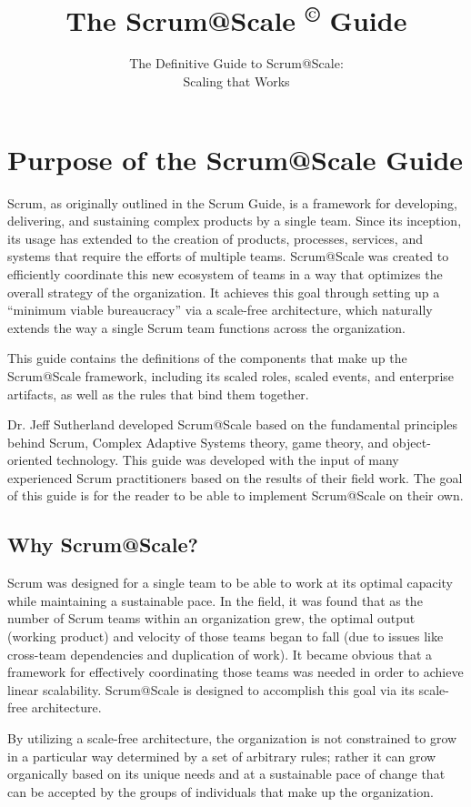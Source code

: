 \documentclass[12pt,a4paper,parskip=full]{scrartcl}
\title{\Huge{\color{red}\textbf{The Scrum@Scale
\textsuperscript{\copyright}
Guide}}}
\subtitle{\color{gray}The Definitive Guide to Scrum@Scale:\\ Scaling that
Works}
\date{}
\begin{document}

\section{Purpose of the Scrum@Scale Guide}
Scrum, as originally outlined in the Scrum Guide, is a framework for
developing, delivering, and sustaining complex products by a single team.
Since its inception, its usage has extended to the creation of products,
processes, services, and systems that require the efforts of multiple
teams. Scrum@Scale was created to efficiently coordinate this new ecosystem
of teams in a way that optimizes the overall strategy of the organization.
It achieves this goal through setting up a ``minimum viable bureaucracy''
via a scale-free architecture, which naturally extends the way a single
Scrum team functions across the organization.

This guide contains the definitions of the components that make up the
Scrum@Scale framework, including its scaled roles, scaled events, and
enterprise artifacts, as well as the rules that bind them together.

Dr. Jeff Sutherland developed Scrum@Scale based on the fundamental
principles behind Scrum, Complex Adaptive Systems theory, game theory, and
object-oriented technology. This guide was developed with the input of many
experienced Scrum practitioners based on the results of their field work.
The goal of this guide is for the reader to be able to implement Scrum@Scale
on their own.

\subsection{Why Scrum@Scale?}
Scrum was designed for a single team to be able to work at its optimal
capacity while maintaining a sustainable pace. In the field, it was found
that as the number of Scrum teams within an organization grew, the optimal
output (working product) and velocity of those teams began to fall (due to
issues like cross-team dependencies and duplication of work). It became
obvious that a framework for effectively coordinating those teams was
needed in order to achieve linear scalability. Scrum@Scale is designed to
accomplish this goal via its scale-free architecture.

By utilizing a scale-free architecture, the organization is not constrained
to grow in a particular way determined by a set of arbitrary rules; rather
it can grow organically based on its unique needs and at a sustainable pace
of change that can be accepted by the groups of individuals that make up
the organization.
\end{document}
